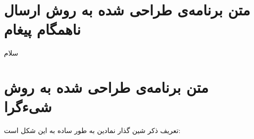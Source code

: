 \section*{متن برنامه‌ی طراحی شده به روش ارسال  ناهمگام پیغام}
سلام
\section*{متن برنامه‌ی طراحی شده به روش شیءگرا}
تعریف ذکر شین گذار نمادین به طور ساده به این شکل است:

